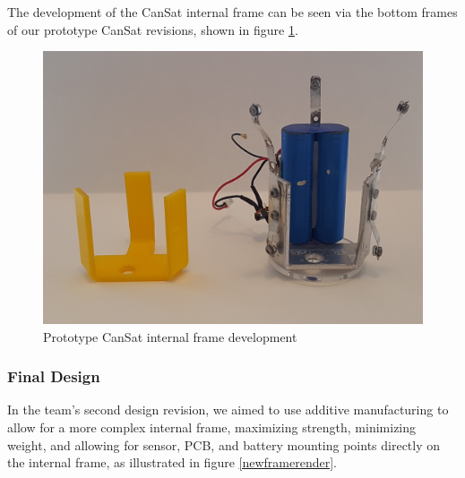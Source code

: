 \documentclass[]{report}
\begin{document}
The development of the CanSat internal frame can be seen via the bottom frames of our prototype CanSat revisions, shown in figure \ref{ointframedev}.


\begin{figure}[h]
	\hfill\includegraphics[scale=0.15]{old_frame.jpg}\hspace*{\fill}
	\caption{Prototype CanSat internal frame development}
	\label{ointframedev}
\end{figure}

\subsubsection{Final Design}
In the team's second design revision, we aimed to use additive manufacturing to allow for a more complex internal frame, maximizing strength, minimizing weight, and allowing for sensor, PCB, and battery mounting points directly on the internal frame, as illustrated in figure \ref{newframerender}.

\end{document}
